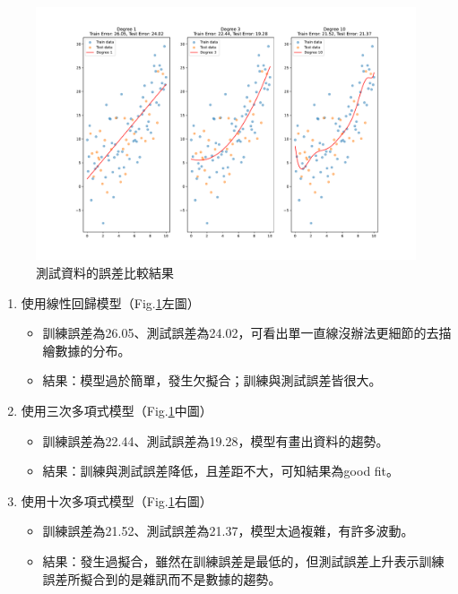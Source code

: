 \documentclass[12pt,a4paper]{article}
\begin{document}
\begin{CJK}{UTF8}{bkai}
\begin{itemize}
\begin{enumerate}
        \begin{figure}[h]
            \centering
            \includegraphics[width=1\linewidth]{figures/output/practice_1/output1_4.pdf}
            \caption{測試資料的誤差比較結果}
            \label{fig:design}
        \end{figure}
        \begin{enumerate}
            \item 使用線性回歸模型（Fig.\ref{fig:design}左圖）
            \begin{itemize}
                \item 訓練誤差為26.05、測試誤差為24.02，可看出單一直線沒辦法更細節的去描繪數據的分布。
                \item 結果：模型過於簡單，發生欠擬合；訓練與測試誤差皆很大。
            \end{itemize}
            \item 使用三次多項式模型（Fig.\ref{fig:design}中圖）
            \begin{itemize}
                \item 訓練誤差為22.44、測試誤差為19.28，模型有畫出資料的趨勢。
                \item 結果：訓練與測試誤差降低，且差距不大，可知結果為good fit。
            \end{itemize}
            \item 使用十次多項式模型（Fig.\ref{fig:design}右圖）
            \begin{itemize}
                \item 訓練誤差為21.52、測試誤差為21.37，模型太過複雜，有許多波動。
                \item 結果：發生過擬合，雖然在訓練誤差是最低的，但測試誤差上升表示訓練誤差所擬合到的是雜訊而不是數據的趨勢。
            \end{itemize}
        \end{enumerate}
    \end{enumerate}
    

\end{itemize}
\end{CJK}
\end{document}
